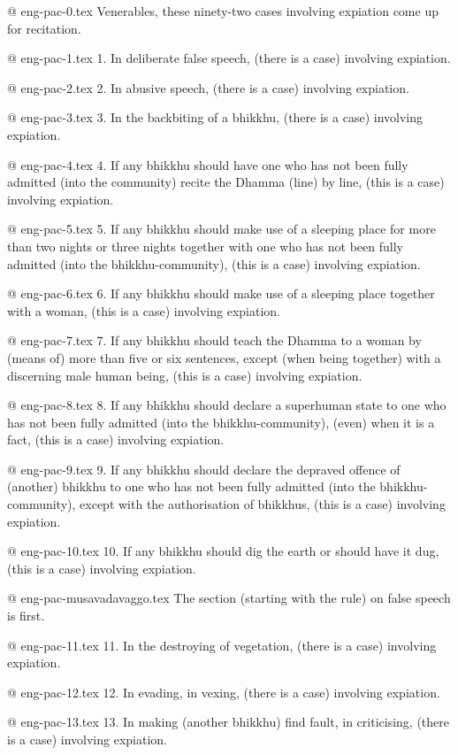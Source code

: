 @ eng-pac-0.tex
Venerables, these ninety-two cases involving expiation come up for recitation.

@ eng-pac-1.tex
1. In deliberate false speech, (there is a case) involving expiation.

@ eng-pac-2.tex
2. In abusive speech, (there is a case) involving expiation.

@ eng-pac-3.tex
3. In the backbiting of a bhikkhu, (there is a case) involving expiation.

@ eng-pac-4.tex
4. If any bhikkhu should have one who has not been fully admitted (into the community) recite the Dhamma (line) by line, (this is a case) involving expiation.

@ eng-pac-5.tex
5. If any bhikkhu should make use of a sleeping place for more than two nights or three nights together with one who has not been fully admitted (into the bhikkhu-community), (this is a case) involving expiation.

@ eng-pac-6.tex
6. If any bhikkhu should make use of a sleeping place together with a woman, (this is a case) involving expiation.

@ eng-pac-7.tex
7. If any bhikkhu should teach the Dhamma to a woman by (means of) more than five or six sentences, except (when being together) with a discerning male human being, (this is a case) involving expiation.

@ eng-pac-8.tex
8. If any bhikkhu should declare a superhuman state to one who has not been fully admitted (into the bhikkhu-community), (even) when it is a fact, (this is a case) involving expiation.

@ eng-pac-9.tex
9. If any bhikkhu should declare the depraved offence of (another) bhikkhu to one who has not been fully admitted (into the bhikkhu-community), except with the authorisation of bhikkhus, (this is a case) involving expiation.

@ eng-pac-10.tex
10. If any bhikkhu should dig the earth or should have it dug, (this is a case) involving expiation.

@ eng-pac-musavadavaggo.tex
The section (starting with the rule) on false speech is first.

@ eng-pac-11.tex
11. In the destroying of vegetation, (there is a case) involving expiation.

@ eng-pac-12.tex
12. In evading, in vexing, (there is a case) involving expiation.

@ eng-pac-13.tex
13. In making (another bhikkhu) find fault, in criticising, (there is a case) involving expiation.

